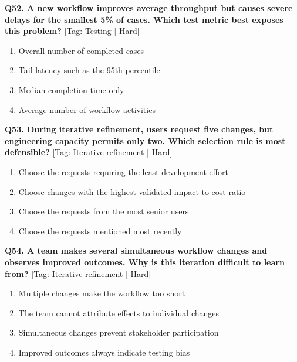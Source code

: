 \noindent\textbf{Q52. A new workflow improves average throughput but causes severe delays for the smallest 5\% of cases. Which test metric best exposes this problem?} \hfill [Tag: Testing | Hard]
\begin{enumerate}[label=(\alph*),topsep=2pt,itemsep=1pt,partopsep=0pt,parsep=0pt]
    \item {Overall number of completed cases}
    \item {Tail latency such as the 95th percentile}
    \item {Median completion time only}
    \item {Average number of workflow activities}
\end{enumerate}
\vspace{2mm}

\noindent\textbf{Q53. During iterative refinement, users request five changes, but engineering capacity permits only two. Which selection rule is most defensible?} \hfill [Tag: Iterative refinement | Hard]
\begin{enumerate}[label=(\alph*),topsep=2pt,itemsep=1pt,partopsep=0pt,parsep=0pt]
    \item {Choose the requests requiring the least development effort}
    \item {Choose changes with the highest validated impact-to-cost ratio}
    \item {Choose the requests from the most senior users}
    \item {Choose the requests mentioned most recently}
\end{enumerate}
\vspace{2mm}

\noindent\textbf{Q54. A team makes several simultaneous workflow changes and observes improved outcomes. Why is this iteration difficult to learn from?} \hfill [Tag: Iterative refinement | Hard]
\begin{enumerate}[label=(\alph*),topsep=2pt,itemsep=1pt,partopsep=0pt,parsep=0pt]
    \item {Multiple changes make the workflow too short}
    \item {The team cannot attribute effects to individual changes}
    \item {Simultaneous changes prevent stakeholder participation}
    \item {Improved outcomes always indicate testing bias}
\end{enumerate}
\vspace{2mm}

